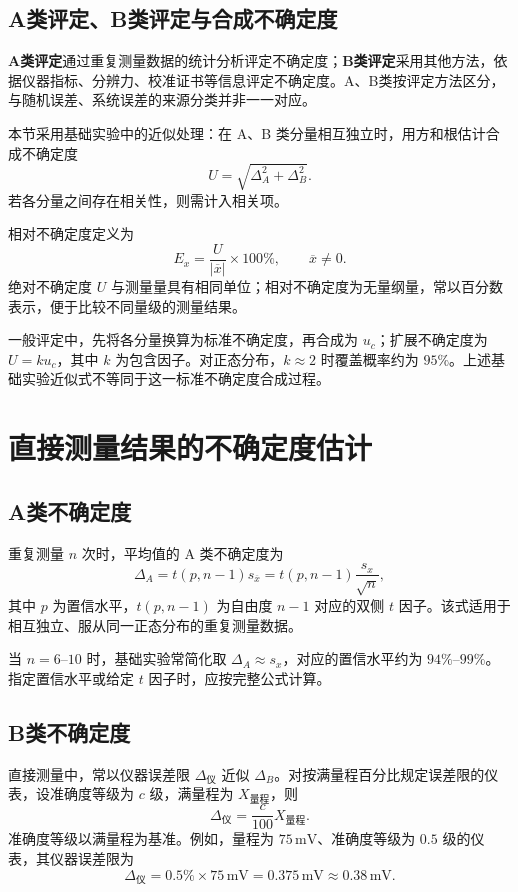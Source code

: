 \documentclass[UTF8, fontset=fandol, a4paper, 12pt]{ctexart}
\theoremstyle{definition}
\newcommand{\meanx}{\overline{x}}
\newcommand{\abs}[1]{\left|#1\right|}
\begin{document}
\subsection*{A类评定、B类评定与合成不确定度}

\textbf{A类评定}通过重复测量数据的统计分析评定不确定度；\textbf{B类评定}采用其他方法，依据仪器指标、分辨力、校准证书等信息评定不确定度。A、B类按评定方法区分，与随机误差、系统误差的来源分类并非一一对应。

本节采用基础实验中的近似处理：在 A、B 类分量相互独立时，用方和根估计合成不确定度
\[
  U=\sqrt{\Delta_A^2+\Delta_B^2}.
\]
若各分量之间存在相关性，则需计入相关项。

相对不确定度定义为
\[
  E_x=\frac{U}{\abs{\meanx}}\times100\%,\qquad \meanx\ne0.
\]
绝对不确定度 $U$ 与测量量具有相同单位；相对不确定度为无量纲量，常以百分数表示，便于比较不同量级的测量结果。

一般评定中，先将各分量换算为标准不确定度，再合成为 $u_c$；扩展不确定度为 $U=ku_c$，其中 $k$ 为包含因子。对正态分布，$k\approx2$ 时覆盖概率约为 $95\%$。上述基础实验近似式不等同于这一标准不确定度合成过程。

\section{直接测量结果的不确定度估计}

\subsection*{A类不确定度}

重复测量 $n$ 次时，平均值的 A 类不确定度为
\[
  \Delta_A=t(p,n-1)s_{\meanx}
  =t(p,n-1)\frac{s_x}{\sqrt n},
\]
其中 $p$ 为置信水平，$t(p,n-1)$ 为自由度 $n-1$ 对应的双侧 $t$ 因子。该式适用于相互独立、服从同一正态分布的重复测量数据。

当 $n=6$--$10$ 时，基础实验常简化取 $\Delta_A\approx s_x$，对应的置信水平约为 $94\%$--$99\%$。指定置信水平或给定 $t$ 因子时，应按完整公式计算。

\subsection*{B类不确定度}

直接测量中，常以仪器误差限 $\Delta_{\text{仪}}$ 近似 $\Delta_B$。对按满量程百分比规定误差限的仪表，设准确度等级为 $c$ 级，满量程为 $X_{\text{量程}}$，则
\[
  \Delta_{\text{仪}}=\frac{c}{100}X_{\text{量程}}.
\]
准确度等级以满量程为基准。例如，量程为 $75\,\mathrm{mV}$、准确度等级为 $0.5$ 级的仪表，其仪器误差限为
\[
  \Delta_{\text{仪}}=0.5\%\times75\,\mathrm{mV}
  =0.375\,\mathrm{mV}\approx0.38\,\mathrm{mV}.
\]
\end{document}
